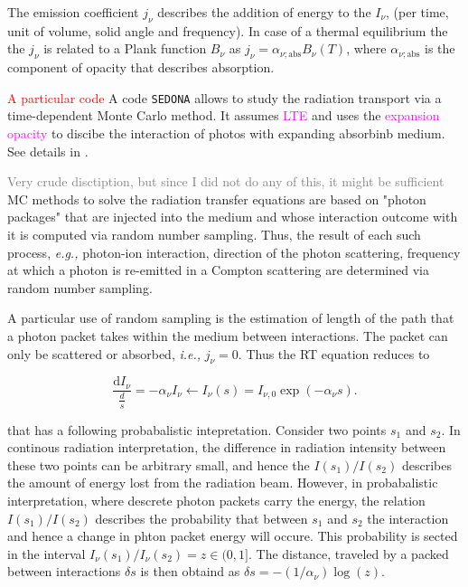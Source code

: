 \documentclass[11pt,a4paper,headinclude=true,DIV=14,BCOR=8mm,chapterprefix,listof=totoc,twoside,openright,abstracton]{scrbook}
\newcommand{\red}[1]{\textcolor{red}{#1}}
\newcommand{\magenta}[1]{\textcolor{magenta}{#1}} %
\newcommand{\gray}[1]{\textcolor{gray}{#1}}
\begin{document}
The emission coefficient $j_{\nu}$ describes the addition of energy to the $I_{\nu}$, (per time, unit of volume, solid angle and frequency). 
In case of a thermal equilibrium the the $j_{\nu}$ is related to a Plank function $B_{\nu}$ as $j_{\nu} = \alpha_{\nu; \text{abs}}B_{\nu}(T)$, where $\alpha_{\nu; \text{abs}}$ is the component of opacity that describes absorption. 

\red{A particular code}
A code \texttt{SEDONA} allows to study the radiation transport via a time-dependent Monte Carlo method. It assumes \magenta{LTE} and uses the \magenta{expansion opacity} to discibe the interaction of photos with expanding absorbinb medium. See details in \cite{Kasen et al. (2006).}.

\gray{Very crude disctiption, but since I did not do any of this, it might be sufficient} 
MC methods to solve the radiation transfer equations are based on "photon packages" that are injected into the medium and whose interaction outcome with it is computed via random number sampling. Thus, the result of each such process, \textit{e.g.,} photon-ion interaction, direction of the photon scattering, frequency at which a photon is re-emitted in a Compton scattering are determined via random number sampling. 

A particular use of random sampling is the estimation of length of the path that a photon packet takes within the medium between interactions. The packet can only be scattered or absorbed, \textit{i.e.,} $j_{\nu}=0$. Thus the RT equation reduces to 

\begin{equation}
    \frac{\text{d}I_{\nu}}{\frac{d}s} = -\alpha_{\nu} I_{\nu} \leftarrow I_{\nu}(s) = I_{\nu,0}\exp(-\alpha_{\nu}s).
\end{equation}

that has a following probabalistic intepretation. Consider two points $s_1$ and $s_2$. In continous radiation interpretation, the difference in radiation intensity between these two points can be arbitrary small, and hence the $I(s_1)/I(s_2)$ describes the amount of energy lost from the radiation beam.
However, in probabalistic interpretation, where descrete photon packets carry the energy, the relation $I(s_1)/I(s_2)$ describes the probability that between $s_1$ and $s_2$ the interaction and hence a change in phton packet energy will occure. 
This probability is sected in the interval $I_{\nu}(s_1)/I_{\nu}(s_2) = z \in (0,1]$. 
The distance, traveled by a packed between interactions $\delta s$ is then obtaind as $\delta s = - (1 / \alpha_{\nu}) \log(z)$. 
\end{document}
